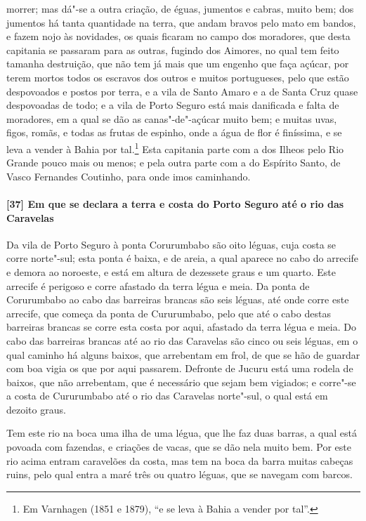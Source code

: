 \begin{linenumbers}
morrer; mas dá"-se a outra criação, de éguas, jumentos e cabras, muito bem; dos jumentos há
tanta quantidade na terra, que andam bravos pelo mato em bandos, e fazem nojo às
novidades, os quais ficaram no campo dos moradores, que desta capitania se passaram para
as outras, fugindo dos Aimores, no qual tem feito tamanha destruição, que não tem já mais
que um engenho que faça açúcar, por terem mortos todos os escravos dos outros e muitos
portugueses, pelo que estão despovoados e postos por terra, e a vila de Santo Amaro e a de
Santa Cruz quase despovoadas de todo; e a vila de Porto Seguro está mais danificada e
falta de moradores, em a qual se dão as canas"-de"-açúcar muito bem; e muitas uvas, figos,
romãs, e todas as frutas de espinho, onde a água de flor é finíssima, e se leva a vender à
Bahia por tal.\footnote{ Em Varnhagen (1851 e 1879), ``e se leva à Bahia a vender por
tal''.} Esta capitania parte com a dos Ilheos pelo Rio Grande pouco mais ou menos; e pela
outra parte com a do Espírito Santo, de Vasco Fernandes Coutinho, para onde imos
caminhando.

\paragraph{[37] Em que se declara a terra e costa do Porto Seguro até o rio das Caravelas} \quad
Da vila de Porto Seguro à ponta Corurumbabo são oito léguas, cuja costa se corre
norte"-sul; esta ponta é baixa, e de areia, a qual aparece no cabo do arrecife e demora ao
noroeste, e está em altura de dezessete graus e um quarto. Este arrecife é perigoso e
corre afastado da terra légua e meia. Da ponta de Corurumbabo ao cabo das barreiras
brancas são seis léguas, até onde corre este arrecife, que começa da ponta de Cururumbabo,
pelo que até o cabo destas barreiras brancas se corre esta costa por aqui, afastado da
terra légua e meia. Do cabo das barreiras brancas até ao rio das Caravelas são cinco ou
seis léguas, em o qual caminho há alguns baixos, que arrebentam em frol, de que se hão de
guardar com boa vigia os que por aqui passarem. Defronte de Jucuru está uma rodela de
baixos, que não arrebentam, que é necessário que sejam bem vigiados; e corre"-se a costa de
Cururumbabo até o rio das Caravelas norte"-sul, o qual está em dezoito graus.

Tem este rio na boca uma ilha de uma légua, que lhe faz duas barras, a qual está povoada
com fazendas, e criações de vacas, que se dão nela muito bem. Por este rio acima entram
caravelões da costa, mas tem na boca da barra muitas cabeças ruins, pelo qual entra a maré
três ou quatro léguas, que se navegam com barcos.


\end{linenumbers}
